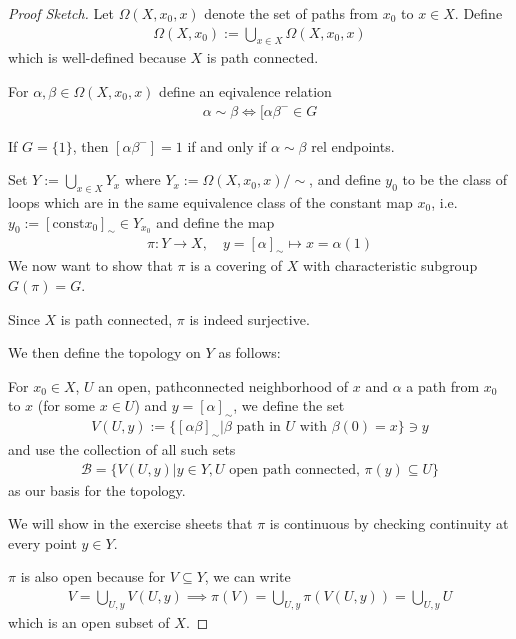 \begin{proof}[Proof Sketch]
  Let $\Omega(X,x_0,x)$ denote the set of paths from $x_0$ to $x \in X$.
  Define
  \begin{align*}
    \Omega(X,x_0) := \bigcup_{x \in X}\Omega(X,x_0,x)
  \end{align*}
  which is well-defined because $X$ is path connected.

  For $\alpha, \beta \in \Omega(X,x_0,x)$ define an eqivalence relation 
  \begin{align*}
    \alpha \sim \beta \iff  [\alpha \beta^{-} \in G
  \end{align*}

  If $G = \{1\}$, then $[\alpha \beta^{-}] = 1$ if and only if $\alpha \sim \beta$ rel endpoints.

  Set $Y := \bigcup_{x \in X}Y_x$ where $Y_x := \Omega(X,x_0,x)/\sim$, and define $y_0$ to be the class of loops which are in the same equivalence class of the constant map $x_0$, i.e. $y_0 := [\text{const}x_0]_{\sim} \in Y_{x_0}$ and define the map
  \begin{align*}
    \pi:Y \to  X, \quad y= [\alpha]_{\sim} \mapsto  x = \alpha(1)
  \end{align*}
  We now want to show that $\pi$ is a covering of $X$ with characteristic subgroup $G(\pi) = G$.

  Since $X$ is path connected, $\pi$ is indeed surjective.

  We then define the topology on $Y$ as follows:

  For $x_0 \in X$, $U$ an open, pathconnected neighborhood of $x$ and $\alpha$ a path from $x_0$ to $x$ (for some $x \in U$) and $y = [\alpha]_{\sim}$, we define the set
  \begin{align*}
    V(U,y) := \{[\alpha \beta]_{\sim}\big\vert \beta \text{ path in $U$ with $\beta(0) = x$}\} \ni y
  \end{align*}
  and use the collection of all such sets
  \begin{align*}
    \mathcal{B} = \{V(U,y) \big\vert y \in Y, U \text{ open path connected, } \pi(y) \subseteq U\}
  \end{align*}
  as our basis for the topology.

  We will show in the exercise sheets that $\pi$ is continuous by checking continuity at every point $y \in Y$.

  $\pi$ is also open because for $V \subseteq Y$, we can write
  \begin{align*}
    V = \bigcup_{U, y} V(U,y) \implies \pi(V) = \bigcup_{U,y} \pi(V(U,y)) = \bigcup_{U,y} U
  \end{align*}
  which is an open subset of $X$.


\end{proof}
